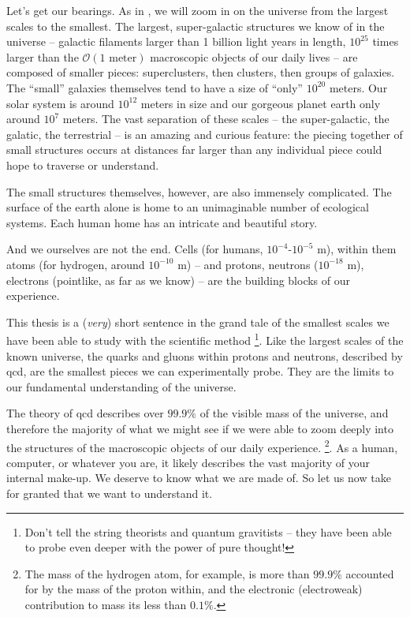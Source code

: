 Let's get our bearings.
%
As in , we will zoom in on the universe from the largest scales to the smallest.
%
The largest, super-galactic structures we know of in the universe -- galactic filaments larger than 1 billion light years in length, \(10^{25}\) times larger than the \(\mathcal{O}(1 \text{ meter})\) macroscopic objects of our daily lives -- are composed of smaller pieces:
%
superclusters, then clusters, then groups of galaxies.
%
The ``small'' galaxies themselves tend to have a size of ``only'' \(10^{20}\) meters.
%
Our solar system is around \(10^{12}\) meters in size and our gorgeous planet earth only around \(10^7\) meters.
%
The vast separation of these scales -- the super-galactic, the galatic, the terrestrial -- is an amazing and curious feature:
%
the piecing together of small structures occurs at distances far larger than any individual piece could hope to traverse or understand.



The small structures themselves, however, are also immensely complicated.
%
The surface of the earth alone is home to an unimaginable number of ecological systems.
%
Each human home has an intricate and beautiful story.

And we ourselves are not the end.
%
Cells (for humans, \(10^{-4}\)-\(10^{-5}\) m), within them atoms (for hydrogen, around \(10^{-10}\) m) -- and protons, neutrons (\(10^{-18}\) m), electrons (pointlike, as far as we know) -- are the building blocks of our experience.

This thesis is a (\textit{very}) short sentence in the grand tale of the smallest scales we have been able to study with the scientific method%
\footnote{
    Don't tell the string theorists and quantum gravitists -- they have been able to probe even deeper with the power of pure thought!
}.
%
Like the largest scales of the known universe, the quarks and gluons within protons and neutrons, described by \gls{qcd}, are the smallest pieces we can experimentally probe.
%
They are the limits to our fundamental understanding of the universe.

The theory of \gls{qcd} describes over \(99.9\%\) of the visible mass of the universe, and therefore the majority of what we might see if we were able to zoom deeply into the structures of the macroscopic objects of our daily experience.%
\footnote{
    The mass of the hydrogen atom, for example, is more than \(99.9\%\) accounted for by the mass of the proton within, and the electronic (electroweak) contribution to mass its less than \(0.1\%\).
}.
%
As a human, computer, or whatever you are, it likely describes the vast majority of your internal make-up.
%
We deserve to know what we are made of.
%
So let us now take for granted that we want to understand it.


